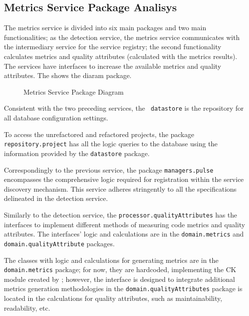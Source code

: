 \subsection{Metrics Service Package Analisys}
\label{sub-metrics-packages}

The metrics service is divided into six main packages and two main functionalities; as the detection service, the metrics service communicates with the intermediary service for the service registry; the second functionality calculates metrics and quality attributes (calculated with the metrics results). The services have interfaces to increase the available metrics and quality attributes. The  shows the diaram package.

\begin{figure}[ht!]
\SetCaptionWidth{\textwidth}
\caption{Metrics Service Package Diagram}
\label{fig-package-metrics}
\fontsize{9}{10}\selectfont

\end{figure}
\FloatBarrier

Consistent with the two preceding services, the \texttt{ datastore} is the repository for all database configuration settings.

To access the unrefactored and refactored projects, the package \texttt{repository.project} has all the logic queries to the database using the information provided by the \texttt{datastore} package.

Correspondingly to the previous service, the package \texttt{managers.pulse} encompasses the comprehensive logic required for registration within the service discovery mechanism. This service adheres stringently to all the specifications delineated in the detection service.

Similarly to the detection service, the \texttt{processor.qualityAttributes} has the interfaces to implement different methods of measuring code metrics and quality attributes. The interfaces' logic and calculations are in the \texttt{domain.metrics} and \texttt{domain.qualityAttribute} packages.

The classes with logic and calculations for generating metrics are in the \texttt{domain.metrics} package; for now, they are hardcoded, implementing the CK module created by \textcite{ck}; however, the interface is designed to integrate additional metrics generation methodologies in the \texttt{domain.qualityAttributes} package is located in the calculations for quality attributes, such as maintainability, readability, etc.

